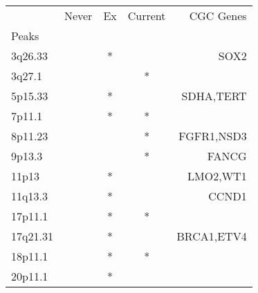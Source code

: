 \begin{tabular}{lcccr}
\toprule
{} & Never & Ex & Current &   CGC Genes \\
Peaks    &       &    &         &             \\
\midrule
3q26.33  &       &  * &         &        SOX2 \\
3q27.1   &       &    &       * &             \\
5p15.33  &       &  * &         &   SDHA,TERT \\
7p11.1   &       &  * &       * &             \\
8p11.23  &       &    &       * &  FGFR1,NSD3 \\
9p13.3   &       &    &       * &       FANCG \\
11p13    &       &  * &         &    LMO2,WT1 \\
11q13.3  &       &  * &         &       CCND1 \\
17p11.1  &       &  * &       * &             \\
17q21.31 &       &  * &         &  BRCA1,ETV4 \\
18p11.1  &       &  * &       * &             \\
20p11.1  &       &  * &         &             \\
\bottomrule
\end{tabular}
